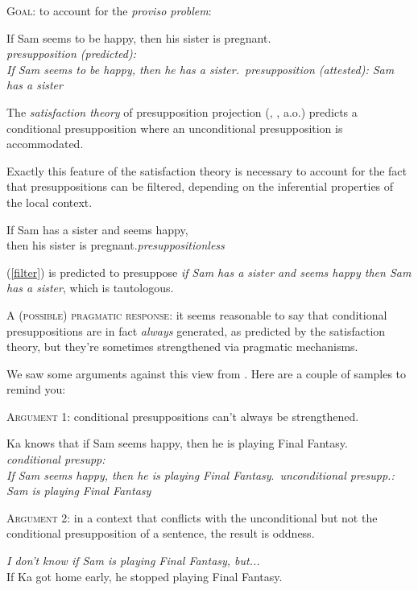 \documentclass[nols,twoside,nofonts,nobib,nohyper]{tufte-handout}
\begin{document}
\textsc{Goal}: to account for the \textit{proviso problem}:

\pex
If Sam seems to be happy, then his sister is pregnant.\\
\a \textit{presupposition (predicted):}\\ \textit{If Sam seems to be happy, then he has a sister.}\,\xmark
\a \textit{presupposition (attested): Sam has a sister}\,\cmark
\xe

The \textit{satisfaction theory} of presupposition projection (\citealt{heim1983}, \citealt{beaver_presupposition_2001}, a.o.) predicts a conditional presupposition where an unconditional presupposition is accommodated.

Exactly this feature of the satisfaction theory is necessary to account for the fact that presuppositions can be filtered, depending on the inferential properties of the local context.

\ex
If Sam has a sister and seems happy,\\
then his sister is pregnant.\hfill\textit{presuppositionless}\label{filter}
\xe

(\ref{filter}) is predicted to presuppose \textit{if Sam has a sister and seems happy then Sam has a sister}, which is tautologous.

\textsc{A (possible) pragmatic response}: it seems reasonable to say that conditional presuppositions are in fact \textit{always} generated, as predicted by the satisfaction theory, but they're sometimes strengthened via pragmatic mechanisms.

We saw some arguments against this view from \cite{mandelkern2016}. Here are a couple of samples to remind you:

\textsc{Argument 1}: conditional presuppositions can't always be strengthened.

\pex
Ka knows that if Sam seems happy, then he is playing Final Fantasy.\\
\a \textit{conditional presupp:}\\
\textit{If Sam seems happy, then he is playing Final Fantasy}.\,\cmark
\a \textit{unconditional presupp.: Sam is playing Final Fantasy}\,\xmark
\xe

\textsc{Argument 2}: in a context that conflicts with the unconditional but not the conditional presupposition of a sentence, the result is oddness.

\ex
\ljudge{\#}\textit{I don't know if Sam is playing Final Fantasy, but...}\\
If Ka got home early, he stopped playing Final Fantasy.
\xe
\end{document}

